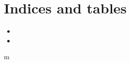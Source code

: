 \documentclass[letterpaper,10pt,english]{sphinxmanual}
\begin{document}
\chapter{Indices and tables}
\label{\detokenize{index:indices-and-tables}}\begin{itemize}
\item {} 

\item {} 

\end{itemize}


\renewcommand{\indexname}{Python Module Index}
\begin{sphinxtheindex}
\def\bigletter#1{{\Large\sffamily#1}\nopagebreak\vspace{1mm}}
\bigletter{m}
\item {}
\end{sphinxtheindex}

\renewcommand{\indexname}{Index}
\printindex
\end{document}
